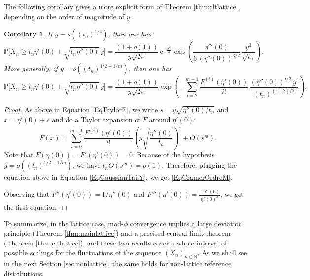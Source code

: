 \documentclass[12pt,a4paper,reqno]{amsart}
\newtheorem{corollary}[lemma]{Corollary}
\theoremstyle{remark}
\newcommand{\N}{\mathbb{N}}
\newcommand{\E}{\mathrm{e}}
\newcommand{\proba}{\mathbb{P}}
\begin{document}
The following corollary gives
a more explicit form of Theorem \ref{thm:cltlattice},
depending on the order of magnitude of $y$.
\begin{corollary}
    If $y=o((t_n)^{1/4})$, then one has
\begin{equation}
    \proba\!\big[X_n \ge t_n \eta'(0) + \sqrt{t_n \eta''(0)}\, y\big] 
    =\frac{ (1+o(1))}{y\sqrt{2\pi}} \,\E^{-\frac{y^2}{2}}\, \exp\left( \frac{\eta'''(0)}{6\,(\eta''(0))^{3/2}}\,\frac{y^3}{\sqrt{t_n}}
    \right) .
\label{EqCramerOrdre3}
\end{equation}
More generally, if $y=o((t_n)^{1/2-1/m})$, then one has
\begin{equation}
    \proba\!\big[X_n \ge t_n \eta'(0) + \sqrt{t_n \eta''(0)}\, y\big] 
    =\frac{(1+o(1))}{y\sqrt{2\pi}} \exp\left( - \sum_{i=2}^{m-1} \frac{F^{(i)}(\eta'(0))}{i!}\,\frac{(\eta''(0))^{i/2}\, y^i}{(t_n)^{(i-2)/2}}
    \right).
\label{EqCramerOrdreM}
\end{equation}
\end{corollary}
\begin{proof}
    As above in Equation \eqref{EqTaylorF}, we write $s=y\sqrt{\eta''(0)/t_{n}}$
    and $x=\eta'(0)+s$ and do a Taylor expansion of $F$ around $\eta'(0)$:
    \[F(x) = \sum_{i=0}^{m-1} \frac{F^{(i)}(\eta'(0))}{i!} \left( y\sqrt{\frac{\eta''(0)}{t_{n}}} \right)^i +O(s^{m}).\]
    Note that $F(\eta(0))=F'(\eta'(0))=0$.
    Because of the hypothesis $y=o((t_n)^{1/2-1/m})$, we have $t_n O(s^{m})=o(1)$.
    Therefore, plugging the equation above in Equation \eqref{EqGaussianTailY},
    we get \eqref{EqCramerOrdreM}.\medskip

    Observing that $F''(\eta'(0))=1/\eta''(0)$ and $F'''(\eta'(0))=\frac{-\eta'''(0)}{\eta''(0)^3}$,
    we get the first equation.
\end{proof}

To summarize, in the lattice case, mod-$\phi$ convergence implies a large deviation principle (Theorem \ref{thm:mainlattice}) and a precised central limit theorem (Theorem \ref{thm:cltlattice}), and these two results cover a whole interval of possible scalings for the fluctuations of the sequence $(X_n)_{n \in \N}$. As we shall see in the next Section \ref{sec:nonlattice}, the same holds for non-lattice reference distributions.
\bigskip
\bigskip
\end{document}
